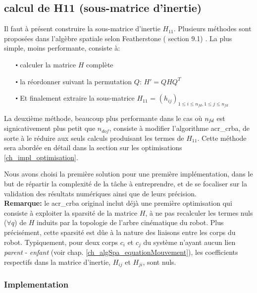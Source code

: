 \documentclass{report}
\begin{document}
\subsection{calcul de H11 (sous-matrice d'inertie)}

Il faut à présent construire la sous-matrice d'inertie $H_{11}$. Plusieurs méthodes sont proposées dans l'algèbre spatiale selon Featherstone (\cite{bib_featherstone} section 9.1) . La plus simple, moins performante, consiste à:
\begin{itemize}
\item[$\centerdot$] calculer la matrice $H$ complète
\item[$\centerdot$] la réordonner suivant la permutation $Q$: $H'=Q H Q^T$
\item[$\centerdot$] Et finalement extraire la sous-matrice $H_{11}$ = $(h_{ij})_{1 \leqslant i \leqslant n_{fd},1 \leqslant j \leqslant n_{fd}}$
\end{itemize}
\bigskip
La deuxième méthode, beaucoup plus performante dans le cas où $n_{\emph{fd}}$ est signicativement plus petit que $n_{dof}$, consiste à modifier l'algorithme \gls{acr_crba}, de sorte à le réduire aux seuls calculs produisant les termes de $H_{11}$. Cette méthode sera abordée en détail dans la section sur les optimisations \ref{ch_impl_optimisation}.

Nous avons choisi la première solution pour une première implémentation, dans le but de répartir la complexité de la tâche à entreprendre, et de se focaliser sur la validation des résultats numériques ainsi que de leurs précision.\\
\textbf{Remarque:} le \gls{acr_crba} original inclut déjà une première optimisation qui consiste à exploiter la sparsité de la matrice $H$, \cad à ne pas recalculer les termes nuls ($\forall q$) de $H$ induits par la topologie de l'arbre cinématique du robot. Plus précisément, cette sparsité est dûe à la nature des liaisons entre les corps du robot. Typiquement, pour deux corps $c_i$ et $c_j$ du système n'ayant aucun lien \emph{parent} - \emph{enfant} (voir chap. \ref{ch_algSpa_equationMouvement}), les coefficients respectifs dans la matrice d'inertie, $H_{ij}$ et $H_{ji}$, sont nuls.

\subsubsection{Implementation}
\end{document}
